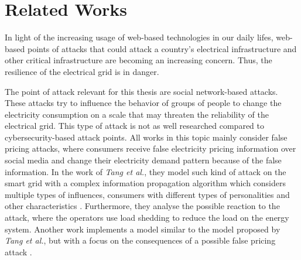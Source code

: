 \chapter{Related Works}

In light of the increasing usage of web-based technologies in our daily 
lifes, web-based points of attacks that could attack a country's 
electrical infrastructure and other critical infrastructure 
are becoming an increasing concern.
Thus, the resilience of the electrical grid is in danger.


The point of attack relevant for this thesis are social network-based
attacks. These attacks try to influence the behavior of groups of people to 
change the electricity consumption on a scale that may threaten the reliability
of the electrical grid. This type of attack is not as well researched 
compared to cybersecurity-based attack points. All works in this topic
mainly consider false pricing attacks, where consumers receive false 
electricity pricing information over social media and change their 
electricity demand pattern because of the false information.
In the work of \textit{Tang et al.}, they model such kind of attack on the 
smart grid with a complex information propagation algorithm which considers 
multiple types of influences, consumers with different types of 
personalities and other characteristics \cite{falsepricing1}.
Furthermore, they analyse the possible reaction to the attack, where
the operators use load shedding to reduce the load on the energy system. 
Another work implements a model similar to the model
proposed by \textit{Tang et al.}, but with a focus on the consequences of a 
possible false pricing attack \cite{vulnerabilityanalysis}.

